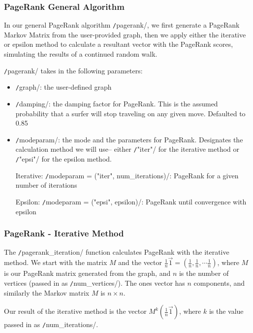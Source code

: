 \documentclass[12pt, titlepage, twoside]{amsart}
\begin{document}
\subsubsection{PageRank General Algorithm}

In our general PageRank algorithm \texttt/pagerank/,
we first generate a PageRank Markov Matrix from the user-provided graph,
then we apply either the iterative or epsilon method to calculate a resultant vector with the PageRank scores, simulating the results of a continued random walk.

\texttt/pagerank/ takes in the following parameters:

\begin{itemize}[label={}]
\item \texttt/graph/: the user-defined graph

\item \texttt/damping/: the damping factor for PageRank.
This is the assumed probability that a surfer will stop traveling on any given move. Defaulted to 0.85

\item \texttt/modeparam/: the mode and the parameters for PageRank.
Designates the calculation method we will use--
either \texttt/"iter"/ for the iterative method or \texttt/"epsi"/ for the epsilon method.

Iterative: \texttt/modeparam = ("iter", num_iterations)/:
PageRank for a given number of iterations

Epsilon: \texttt/modeparam = ("epsi", epsilon)/: PageRank until convergence with epsilon
\end{itemize}

\subsubsection{PageRank - Iterative Method}

The \texttt/pagerank_iteration/ function calculates PageRank with the iterative method.
We start with the matrix $M$ and the vector $\frac{1}{n}\vec{1} = (\frac{1}{n}, \frac{1}{n}, \cdots \frac{1}{n})$,
where $M$ is our PageRank matrix generated from the graph,
and $n$ is the number of vertices (passed in as \texttt/num_vertices/).
The ones vector has $n$ components, and similarly the Markov matrix $M$ is $n\times n$.

Our result of the iterative method is the vector $M^k (\frac{1}{n}\vec{1})$,
where $k$ is the value passed in as \texttt/num_iterations/.
\end{document}
